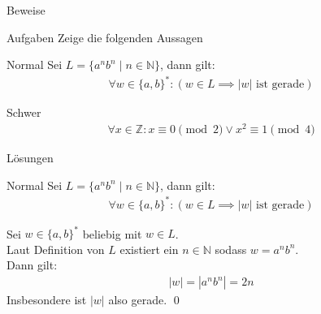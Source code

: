 {
\begin{frame}[fragile]{Beweise}
    \begin{alertblock}{Aufgaben}
        Zeige die folgenden Aussagen
    \end{alertblock}
    \begin{block}{Normal}
        Sei $L = \{a^nb^n \mid n \in \mathbb{N}\}$, dann gilt:
        \begin{align*}
            \forall w \in \{a, b\}^*: \left(w \in L \implies |w| \text{ ist gerade}\right)
        \end{align*}
    \end{block}
    \begin{block}{Schwer}
        \begin{align*}
            \forall x \in \mathbb{Z}: x \equiv 0 \pmod{2} \vee x^2 \equiv 1 \pmod{4}
        \end{align*}
    \end{block}
\end{frame}
}

{
\begin{frame}[fragile]{Lösungen}
    \begin{block}{Normal}
        Sei $L = \{a^nb^n \mid n \in \mathbb{N}\}$, dann gilt:
        \begin{align*}
            \forall w \in \{a, b\}^*: \left(w \in L \implies |w| \text{ ist gerade}\right)
        \end{align*}
    \end{block}
    Sei $w \in \{a,b\}^*$ beliebig mit $w \in L$.\\
    Laut Definition von $L$ existiert ein $n \in \mathbb{N}$ sodass $w = a^nb^n$.\\
    Dann gilt:
    \begin{align*}
        |w| = |a^nb^n| = 2n 
    \end{align*}
    Insbesondere ist $|w|$ also gerade. \qed
\end{frame}
}

